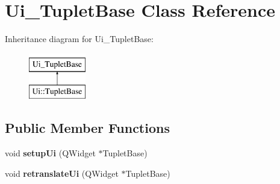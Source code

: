 \hypertarget{class_ui___tuplet_base}{}\section{Ui\+\_\+\+Tuplet\+Base Class Reference}
\label{class_ui___tuplet_base}
Inheritance diagram for Ui\+\_\+\+Tuplet\+Base\+:\begin{figure}[H]
\begin{center}
\leavevmode
\includegraphics[height=2.000000cm]{class_ui___tuplet_base}
\end{center}
\end{figure}
\subsection*{Public Member Functions}
\begin{DoxyCompactItemize}
\item 
\mbox{\label{class_ui___tuplet_base_aa65e3868ac7d25e84e0f59cd66378553}} 
void {\bfseries setup\+Ui} (Q\+Widget $\ast$Tuplet\+Base)
\item 
\mbox{\label{class_ui___tuplet_base_a11cced186735ed7cd898b310e2ff8d4b}} 
void {\bfseries retranslate\+Ui} (Q\+Widget $\ast$Tuplet\+Base)
\end{DoxyCompactItemize}

